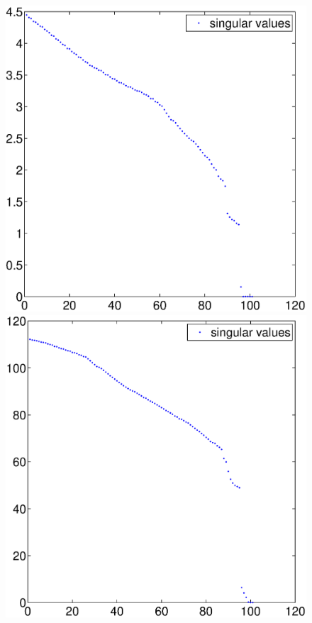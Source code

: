 \begin{figure}[t]
\centering
\begin{minipage}{.492\columnwidth}
  \centering
  \includegraphics[width=\columnwidth]{fig/straight-path-noisefree-svd.eps}
\end{minipage}
\begin{minipage}{.492\columnwidth}
  \centering
  \includegraphics[width=\columnwidth]{fig/straight-path-svd.eps}

\end{minipage}
\end{figure}
